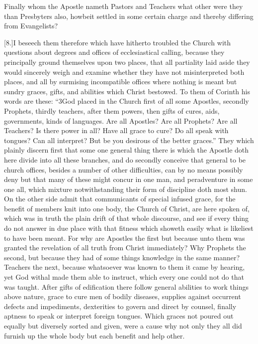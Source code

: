 Finally whom the Apostle nameth Pastors and Teachers what other were they than Presbyters also, howbeit settled in some certain charge and thereby differing from Evangelists?

[8.]I beseech them therefore which have hitherto troubled the Church with questions about degrees and offices of ecclesiastical calling, because they principally ground themselves upon two places, that all partiality laid aside they would sincerely weigh and examine whether they have not misinterpreted both places, and all by surmising incompatible offices where nothing is meant but sundry graces, gifts, and abilities which Christ bestowed. To them of Corinth his words are these: “3God placed in the Church first of all some Apostles, secondly Prophets, thirdly teachers, after them powers, then gifts of cures, aids, governments, kinds  of languages.
 Are all Apostles? Are all Prophets? Are all Teachers? Is there power in all? Have all grace to cure? Do all speak with tongues? Can all interpret? But be you desirous of the better graces.” They which plainly discern first that some one general thing there is which the Apostle doth here divide into all these branches, and do secondly conceive that general to be church offices, besides a number of other difficulties, can by no means possibly deny but that many of these might concur in one man, and peradventure in some one all, which mixture notwithstanding their form of discipline doth most shun. On the other side admit that communicants of special infused grace, for the benefit of members knit into one body, the Church of Christ, are here spoken of, which was in truth the plain drift of that whole discourse, and see if every thing do not answer in due place with that fitness which showeth easily what is likeliest to have been meant. For why are Apostles the first but because unto them was granted the revelation of all truth from Christ immediately? Why Prophets the second, but because they had of some things knowledge in the same manner? Teachers the next, because whatsoever was known to them it came by hearing, yet God withal made them able to instruct, which every one could not do that was taught. After gifts of edification there follow general abilities to work things above nature, grace to cure men of bodily diseases, supplies against occurrent defects and impediments, dexterities to govern and direct by counsel, finally aptness to speak or interpret foreign tongues. Which graces not poured out equally but diversely sorted and given, were a cause why not only they all did furnish up the whole body but each benefit and help other.

